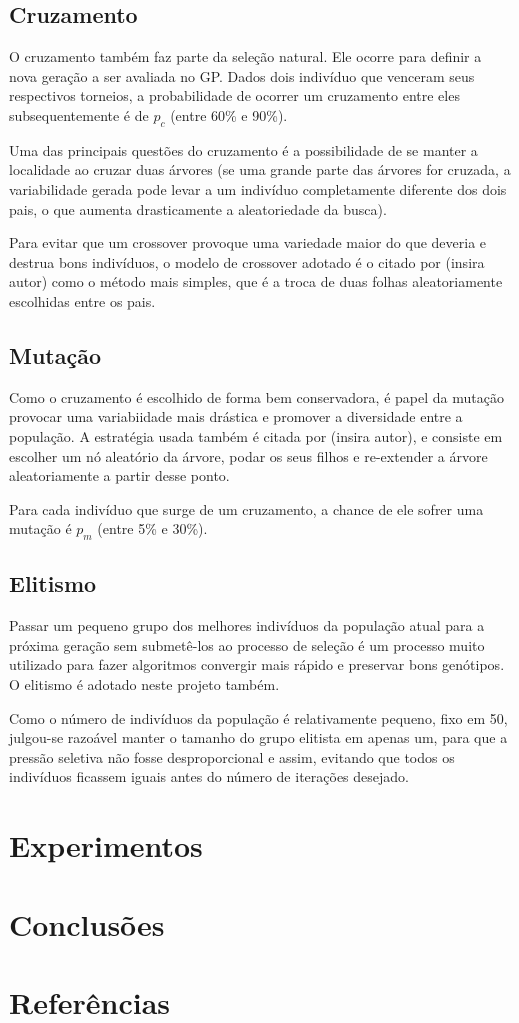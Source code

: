 \documentclass[11pt]{article}
\begin{document}
\subsection*{Cruzamento}

O cruzamento também faz parte da seleção natural. Ele ocorre para definir a nova geração a ser avaliada no GP. Dados dois indivíduo que venceram seus respectivos torneios, a probabilidade de ocorrer um cruzamento entre eles subsequentemente é de $p_c$ (entre 60\% e 90\%).

Uma das principais questões do cruzamento é a possibilidade de se manter a localidade ao cruzar duas árvores (se 	uma grande parte das árvores for cruzada, a variabilidade gerada pode levar a um indivíduo completamente diferente dos dois pais, o que aumenta drasticamente a aleatoriedade da busca).

Para evitar que um crossover provoque uma variedade maior do que deveria e destrua bons indivíduos, o modelo de crossover adotado é o citado por (insira autor) como o método mais simples, que é a troca de duas folhas aleatoriamente escolhidas entre os pais.

\subsection*{Mutação}

Como o cruzamento é escolhido de forma bem conservadora, é papel da mutação provocar uma variabiidade mais drástica e promover a diversidade entre a população. A estratégia usada também é citada por (insira autor), e consiste em escolher um nó aleatório da árvore, podar os seus filhos e re-extender a árvore aleatoriamente a partir desse ponto.

Para cada indivíduo que surge de um cruzamento, a chance de ele sofrer uma mutação é $p_m$ (entre 5\% e 30\%).

\subsection*{Elitismo}

Passar um pequeno grupo dos melhores indivíduos da população atual para a próxima geração sem submetê-los ao processo de seleção é um processo muito utilizado para fazer algoritmos convergir mais rápido e preservar bons genótipos. O elitismo é adotado neste projeto também.

Como o número de indivíduos da população é relativamente pequeno, fixo em 50, julgou-se razoável manter o tamanho do grupo elitista em apenas um, para que a pressão seletiva não fosse desproporcional e assim, evitando que todos os indivíduos ficassem iguais antes do número de iterações desejado.

\section{Experimentos}

\section{Conclusões}

\section{Referências}
\end{document}
